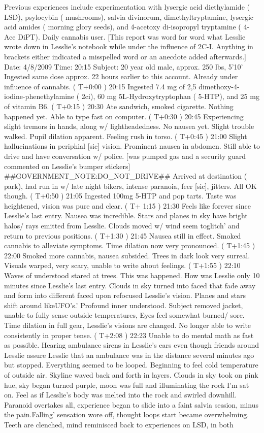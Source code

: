\documentclass[12pt]{book}
\begin{document}
Previous experiences include experimentation with lysergic acid diethylamide ( LSD), psylocybin ( mushrooms), salvia divinorum, dimethyltryptamine, lysergic acid amides ( morning glory seeds), and 4-acetoxy di-isopropyl tryptamine ( 4-Ace DiPT). Daily cannabis user. [This report was word for word what Lesslie wrote down in Lesslie's notebook while under the influence of 2C-I. Anything in brackets either indicated a misspelled word or an anecdote added afterwards.] Date: 4/8/2009 Time: 20:15 Subject: 20 year old male, approx. 250 lbs, 5'10' Ingested same dose approx. 22 hours earlier to this account. Already under influence of cannabis. ( T+0:00 ) 20:15 Ingested 7.4 mg of 2,5 dimethoxy-4-iodine-phenethylamine ( 2ci), 60 mg 5L-Hydroxytryptophan ( 5-HTP), and 25 mg of vitamin B6. ( T+0:15 ) 20:30 Ate sandwich, smoked cigarette. Nothing happened yet. Able to type fast on computer. ( T+0:30 ) 20:45 Experiencing slight tremors in hands, along w/ lightheadedness. No nausea yet. Slight trouble walked. Pupil dilation apparent. Feeling rush in torso. ( T+0:45 ) 21:00 Slight hallucinations in periphial [sic] vision. Prominent nausea in abdomen. Still able to drive and have conversation w/ police. [was pumped gas and a security guard commented on Lesslie's bumper stickers] \#\#GOVERNMENT\_NOTE:DO\_NOT\_DRIVE\#\# Arrived at destination ( park), had run in w/ late night bikers, intense paranoia, feer [sic], jitters. All OK though. ( T+0:50 ) 21:05 Ingested 100mg 5-HTP and pop tarts. Taste was heightened, vision was pure and clear. ( T+ 1:15 ) 21:30 Feels like forever since Lesslie's last entry. Nausea was incredible. Stars and planes in sky have bright halos/ rays emitted from Lesslie. Clouds moved w/ wind seem toglitch' and return to previous positions. ( T+1:30 ) 21:45 Nausea still in effect. Smoked cannabis to alleviate symptoms. Time dilation now very pronounced. ( T+1:45 ) 22:00 Smoked more cannabis, nausea subsided. Trees in dark look very surreal. Visuals warped, very scary, unable to write about feelings. ( T+1:55 ) 22:10 Waves of understood stared at trees. This was happened. How was Lesslie only 10 minutes since Lesslie's last entry. Clouds in sky turned into faced that fade away and form into different faced upon refocused Lesslie's vision. Planes and stars shift around likeUFO's.' Profound inner understood. Subject removed jacket, unable to fully sense outside temperatures, Eyes feel somewhat burned/ sore. Time dilation in full gear, Lesslie's visions are changed. No longer able to write consistently in proper tense. ( T+2:08 ) 22:23 Unable to do mental math as fast as possible. Hearing ambulance sirens in Lesslie's ears even though friends around Lesslie assure Lesslie that an ambulance was in the distance several minutes ago but stopped. Everything seemed to be looped. Beginning to feel cold temperature of outside air. Skyline waved back and forth in layers. Clouds in sky took on pink hue, sky began turned purple, moon was full and illuminating the rock I'm sat on. Feel as if Lesslie's body was melted into the rock and swirled downhill. Paranoid overtakes all, experience began to slide into a faint salvia session, minus the pain.Falling' sensation wore off, thought loops start became overwhelming. Teeth are clenched, mind reminisced back to experiences on LSD, in both 
\end{document}
